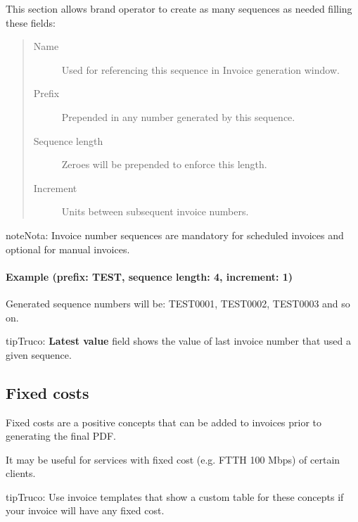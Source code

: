 \documentclass[letterpaper,10pt,spanish]{sphinxmanual}
\begin{document}
This section allows brand operator to create as many sequences as needed filling these fields:
\begin{quote}
\begin{description}
\item[{Name}] \leavevmode
Used for referencing this sequence in Invoice generation window.

\item[{Prefix}] \leavevmode
Prepended in any number generated by this sequence.

\item[{Sequence length}] \leavevmode
Zeroes will be prepended to enforce this length.

\item[{Increment}] \leavevmode
Units between subsequent invoice numbers.

\end{description}
\end{quote}

\begin{notice}{note}{Nota:}
Invoice number sequences are mandatory for scheduled invoices and optional for manual invoices.
\end{notice}
\paragraph{Example (prefix: TEST, sequence length: 4, increment: 1)}

Generated sequence numbers will be: TEST0001, TEST0002, TEST0003 and so on.

\begin{notice}{tip}{Truco:}
\textbf{Latest value} field shows the value of last invoice number that used a given sequence.
\end{notice}


\subsection{Fixed costs}
\label{administration_portal/brand/invoicing/fixed_costs:fixed-costs}\label{administration_portal/brand/invoicing/fixed_costs::doc}\label{administration_portal/brand/invoicing/fixed_costs:id1}
Fixed costs are a positive concepts that can be added to invoices prior to generating the final PDF.

It may be useful for services with fixed cost (e.g. FTTH 100 Mbps) of certain clients.

\begin{notice}{tip}{Truco:}
Use invoice templates that show a custom table for these concepts if your invoice will have any fixed cost.
\end{notice}
\end{document}
